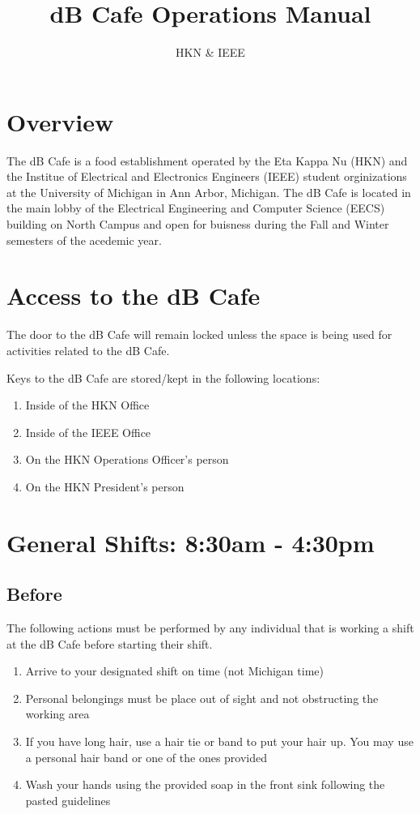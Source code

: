 \documentclass[12pt,onecolumn,letterpaper]{article}
\title{dB Cafe Operations Manual}
\author{HKN \& IEEE}
\date{ }
\begin{document}
\maketitle
\tableofcontents
\newpage

\section{Overview}
The dB Cafe is a food establishment operated by the Eta Kappa Nu (HKN) and the Institue of Electrical and Electronics Engineers (IEEE) student orginizations at the University of Michigan in Ann Arbor, Michigan. The dB Cafe is located in the main lobby of the Electrical Engineering and Computer Science (EECS) building on North Campus and open for buisness during the Fall and Winter semesters of the acedemic year.
\section{Access to the dB Cafe}
The door to the dB Cafe will remain locked unless the space is being used for activities related to the dB Cafe.

Keys to the dB Cafe are stored/kept in the following locations:
\begin{enumerate}
\item Inside of the HKN Office
\item Inside of the IEEE Office
\item On the HKN Operations Officer's person
\item On the HKN President's person
\end{enumerate}

\section{General Shifts: 8:30am - 4:30pm}
\subsection{Before}
The following actions must be performed by any individual that is working a shift at the dB Cafe before starting their shift.
\begin{enumerate}
\item Arrive to your designated shift on time (not Michigan time)
\item Personal belongings must be place out of sight and not obstructing the working area
\item If you have long hair, use a hair tie or band to put your hair up. You may use a personal hair band or one of the ones provided
\item Wash your hands using the provided soap in the front sink following the pasted guidelines
\end{enumerate}
\end{document}
